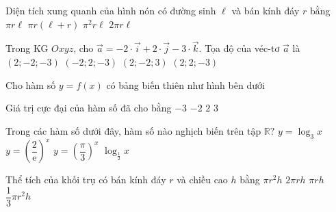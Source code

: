 \begin{ex}%
	Diện tích xung quanh của hình nón có đường sinh $\ell$ và bán kính đáy $r$ bằng	
	\choice
	{\True $\pi r\ell$}
	{$\pi r(\ell+r)$}
	{$\pi^2r\ell$}
	{$2\pi r\ell$}
\end{ex}

\begin{ex}%
	Trong KG $Oxyz$, cho $\overrightarrow{a}=-2\cdot \overrightarrow{i}+2\cdot \overrightarrow{j}-3\cdot\overrightarrow{k}$. Tọa độ của véc-tơ $\overrightarrow{a}$ là	
	\choice
	{$(2;-2;-3)$}
	{\True $(-2;2;-3)$}
	{$(2;-2;3)$}
	{$(2;2;-3)$}
\end{ex}

\begin{ex}%
	Cho hàm số $y=f(x)$ có bảng biến thiên như hình bên dưới
	\begin{center}
	\end{center}
	Giá trị cực đại của hàm số đã cho bằng
	\choice
	{$-3$}
	{$-2$}
	{\True $2$}
	{$3$}
\end{ex}

\begin{ex}%
	Trong các hàm số dưới đây, hàm số nào nghịch biến trên tập $\mathbb{R}?$	
	\choice
	{$y=\log_3x$}
	{\True $y=\left(\dfrac{2}{\mathrm{e}}\right)^x$}
	{$y=\left(\dfrac{\pi}{3}\right)^x$}
	{$\log_{\frac{1}{2}}x$}
\end{ex}

\begin{ex}%
	Thể tích của khối trụ có bán kính đáy $r$ và chiều cao $h$ bằng	
	\choice
	{\True $\pi r^2 h$}
	{$2\pi rh$}
	{$\pi rh$}
	{ $\dfrac{1}{3}\pi r^2 h$}
\end{ex}

